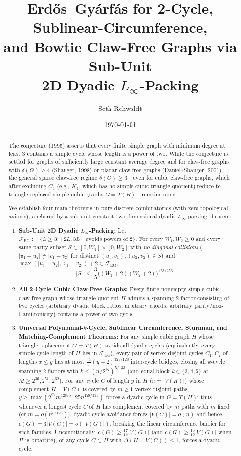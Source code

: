 \documentclass[11pt,reqno]{amsart}
\title[Erd\H{o}s--Gy\'arf\'as for Claw-Free Graphs via 2D Dyadic Packing]{%
Erd\H{o}s--Gy\'arf\'as for 2-Cycle, Sublinear-Circumference,\\
and Bowtie Claw-Free Graphs via Sub-Unit\\
2D Dyadic $L_\infty$-Packing}
\author{Seth Rehwaldt}
\date{\today}
\theoremstyle{plain}
\theoremstyle{definition}
\theoremstyle{remark}
\newcommand{\FEG}{\mathcal{F}_{\mathrm{EG}}}
\newcommand{\EG}{\text{Erd\H{o}s--Gy\'arf\'as}}
\DeclareRobustCommand{\_}{\ifmmode\text{\textunderscore}\else\textunderscore\allowbreak\fi}
\begin{document}
\begin{abstract}
The \EG{} conjecture (1995) asserts that every finite simple graph with minimum degree at least $3$ contains a simple cycle whose length is a power of two. While the conjecture is settled for graphs of sufficiently large constant average degree and for claw-free graphs with $\delta(G) \ge 4$ (Shauger, 1998) or planar claw-free graphs (Daniel--Shauger, 2001), the general sparse claw-free regime $\delta(G) \ge 3$---even for cubic claw-free graphs, which after excluding $C_4$ (e.g., $K_4$, which has no simple cubic triangle quotient) reduce to triangle-replaced simple cubic graphs $G = T(H)$---remains open.

We establish four main theorems in pure discrete combinatorics (with zero topological axioms), anchored by a sub-unit-constant two-dimensional dyadic $L_\infty$-packing theorem:
\begin{enumerate}[label=(\arabic*),leftmargin=2.2em]
  \item \textbf{Sub-Unit 2D Dyadic $L_\infty$-Packing:} Let $\FEG := \{L \ge 3 : [2L, 3L] \text{ avoids powers of } 2\}$. For every $W_1, W_2 \ge 0$ and every same-parity subset $S \subset [0, W_1] \times [0, W_2]$ with \emph{no diagonal collisions} ($|u_1 - u_2| \neq |v_1 - v_2|$ for distinct $(u_1, v_1), (u_2, v_2) \in S$) and $\max(|u_1 - u_2|, |v_1 - v_2|) + 2 \in \FEG$,
  \[
    |S| \;\le\; \frac{3}{5}\bigl((W_1 + 2)(W_2 + 2)\bigr)^{123/256}.
  \]
  \item \textbf{All 2-Cycle Cubic Claw-Free Graphs:} Every finite nonempty simple cubic claw-free graph whose triangle quotient $H$ admits a spanning $2$-factor consisting of two cycles (arbitrary dyadic block ratios, arbitrary chords, arbitrary parity/non-Hamiltonicity) contains a power-of-two cycle.
  \item \textbf{Universal Polynomial-$k$-Cycle, Sublinear Circumference, Sturmian, and Matching-Complement Theorems:} For any simple cubic graph $H$ whose triangle replacement $G = T(H)$ avoids all dyadic cycles (equivalently, every simple cycle length of $H$ lies in $\FEG$), every pair of vertex-disjoint cycles $C_1, C_2$ of lengths $x \le y$ has at most $\frac{12}{5}(y + 2)^{123/128}$ inter-cycle bridges, closing all $k$-cycle spanning $2$-factors with $k \le (n/2^{97})^{5/133}$ (and equal-block $k \in \{3, 4, 5\}$ at $M \ge 2^{36}, 2^{51}, 2^{62}$). For any cycle $C$ of length $y$ in $H$ ($n = |V(H)|$) whose complement $H - V(C)$ is covered by $m \ge 1$ vertex-disjoint paths, $y \ge \max(2^{97} m^{128/5},\, 25 n^{128/133})$ forces a dyadic cycle in $G = T(H)$; thus whenever a longest cycle $C$ of $H$ has complement covered by $m$ paths with $m$ fixed (or $m = o(n^{5/128})$), dyadic-cycle avoidance forces $|V(C)| = o(n)$ and hence $c(G) = 3|V(C)| = o(|V(G)|)$, breaking the linear circumference barrier for such families. Unconditionally, $c(G) \ge \frac{17}{18}|V(G)|$ (and $c(G) \ge \frac{15}{16}|V(G)|$ when $H$ is bipartite), or any cycle $C \subset H$ with $\Delta(H - V(C)) \le 1$, forces a dyadic cycle.

\end{enumerate}
\end{abstract}
\end{document}
